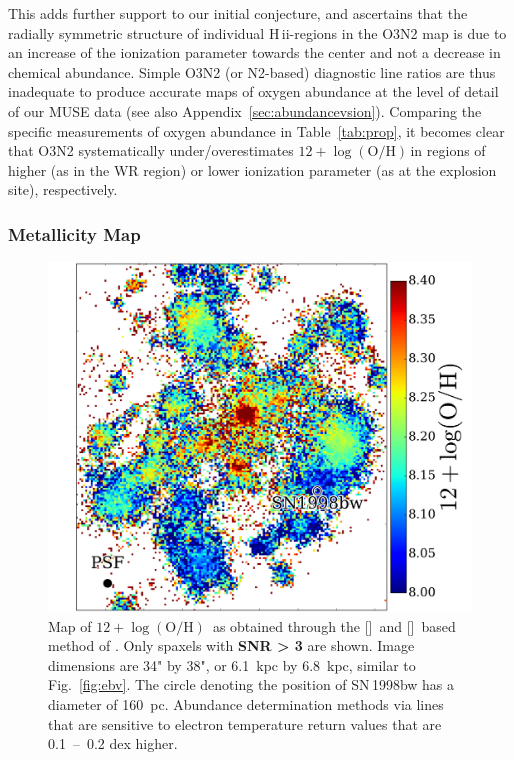 \documentclass[traditabstract, referee]{aa}
\newcommand{\hii}{\mbox{H\,{\sc ii}}}
\newcommand{\oh}{12+\log(\mathrm{O/H})}
\newcommand{\sii}{[\ion{S}{ii}]}
\newcommand{\nii}{[\ion{N}{ii}]}
\begin{document}
This adds further support to our initial conjecture, and ascertains that the radially symmetric structure of individual \hii-regions in the O3N2 map is due to an increase of the ionization parameter towards the center and not a decrease in chemical abundance. Simple O3N2 (or N2-based) diagnostic line ratios are thus inadequate to produce accurate maps of oxygen abundance at the level of detail of our MUSE data (see also Appendix~\ref{sec:abundancevsion}). Comparing the specific measurements of oxygen abundance in Table~\ref{tab:prop}, it becomes clear that O3N2 systematically under/overestimates $\oh$\,in regions of higher (as in the WR region) or lower ionization parameter (as at the explosion site), respectively.

\subsubsection{Metallicity Map}
\label{sec:mapoh}

\begin{figure}
\includegraphics[angle=0, width=0.99\columnwidth]{Figs/MUSE_SN1998bw_OH.pdf}
\caption{Map of $\oh$\, as obtained through the \sii\, and \nii\, based method of \citet{2016Ap&SS.361...61D}. Only spaxels with \textbf{SNR > 3} are shown. Image dimensions are 34" by 38", or 6.1~kpc by 6.8~kpc, similar to Fig.~\ref{fig:ebv}. The circle denoting the position of SN\,1998bw has a diameter of 160~pc. Abundance determination methods via lines that are sensitive to electron temperature return values that are 0.1~--~0.2 dex higher.}
\label{fig:s2}
\end{figure}
\end{document}
